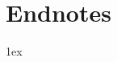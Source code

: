 \renewcommand\enoteformat{\noindent\textbf{\theenmark}.\hspace{1ex}}  %
\chapter*{Endnotes}  %
\renewcommand\notesname{}  %
\vspace{-8ex}  %
\begingroup
\let\clearpage\relax
\parindent 0pt
\parskip 1ex
\def\enotesize{\small}
\theendnotes
\endgroup
